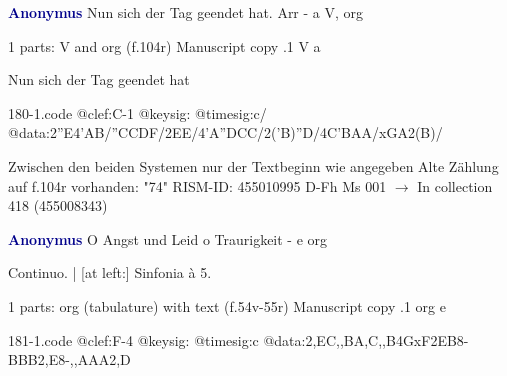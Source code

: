 \documentclass[twocolumn]{book}
\begin{document}
\newline \par \vspace{7pt} \textcolor{darkblue}{\textbf{Anonymus  }}
\newline Nun sich der Tag geendet hat. Arr - a
\newline V, org
\newline \begin{itshape}\end{itshape} 
\newline \textcolor{darkblue}{}  1 parts: V and org  (f.104r)
\newline Manuscript copy
.1  V  a
\newline \begin{footnotesize} Nun sich der Tag geendet hat \end{footnotesize}  
\begin{filecontents*}{180-1.code}
@clef:C-1
@keysig:
@timesig:c/
@data:2''E4'AB/''CCDF/2EE/4'A''DCC/2('B)''D/4C'BAA/xGA2(B)/
\end{filecontents*}
\newline
%

\newline Zwischen den beiden Systemen nur der Textbeginn wie angegeben
\newline Alte Zählung auf f.104r vorhanden: "74"
\newline RISM-ID: 455010995
\newline D-Fh  Ms 001
\newline $\rightarrow$ In collection 418 (455008343)
      
\newline \par \vspace{7pt} \textcolor{darkblue}{\textbf{Anonymus  }}
\newline O Angst und Leid o Traurigkeit - e
\newline org
\newline \begin{itshape}[f.54v, heading:] Continuo. | [at left:] Sinfonia à 5.\end{itshape} 
\newline \textcolor{darkblue}{}  1 parts: org (tabulature) with text  (f.54v-55r)
\newline Manuscript copy
.1  org  e  
\begin{filecontents*}{181-1.code}
@clef:F-4
@keysig:
@timesig:c
@data:2,EC,,BA,C,,B4GxF2EB8-{BBB}2,E8-{,,AAA}2,D
\end{filecontents*}
\newline
%
\end{document}
